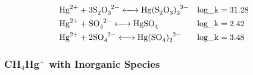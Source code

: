 \documentclass[12pt, a4paper]{article}
\begin{document}
\begin{align}
& \ce{Hg^2+ + 3 S_2O_3^2- <-> Hg(S2O3)_3^3-} && \mathrm{log\_k} = 31.28 \\
& \ce{Hg^2+ + SO_4^2- <-> HgSO4} && \mathrm{log\_k} = 2.42 \\
& \ce{Hg^2+ + 2 SO_4^2- <-> Hg(SO4)_2^2-} && \mathrm{log\_k} = 3.48
\end{align}

\subsubsection{CH$_4$Hg$^{+}$ with Inorganic Species}
\end{document}
